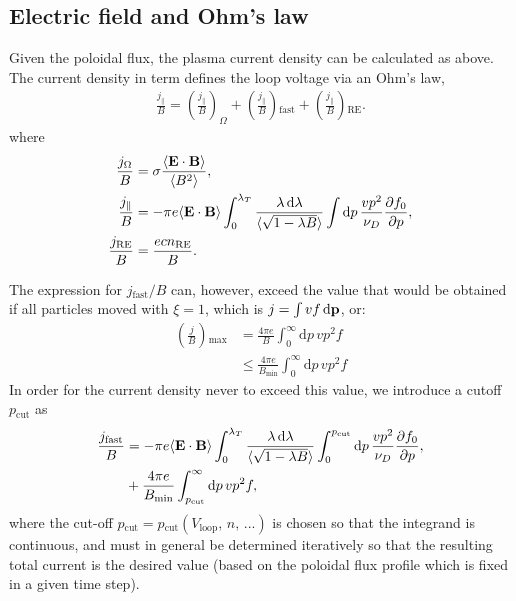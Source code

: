 \documentclass[11pt,a4paper]{article}
\newcommand{\rd}{\ensuremath{\mathrm{d}}}
\newcommand{\sub}[1]{\ensuremath{_{\text{#1}}}}
\renewcommand{\b}[1]{\ensuremath{ {\bf #1 } }}
\begin{document}
\subsection{Electric field and Ohm's law}
Given the poloidal flux, the plasma current density can be calculated as above. The current density in term defines the loop voltage via an Ohm's law,%
\begin{align}
\frac{j_\parallel}{B} = \left(\frac{j_\parallel}{B}\right)_\Omega + \left(\frac{j_\parallel}{B}\right)\sub{fast} + \left(\frac{j_\parallel}{B}\right)\sub{RE}.
\end{align}
where
\begin{align}
\frac{j_\Omega}{B} &= \sigma \frac{\langle \b{E}\cdot\b{B} \rangle}{\langle B^2\rangle}, \nonumber \\
\frac{j_\parallel}{B} &= -\pi  e\langle \b{E}\cdot\b{B}\rangle \int_0^{\lambda_T}\frac{\lambda\,\rd \lambda}{\langle\sqrt{1-\lambda B}\rangle}\int \rd p \, \frac{vp^2}{\nu_D}\frac{\partial f_0}{\partial p}, \nonumber\\
\frac{j\sub{RE}}{B} &= \frac{ecn\sub{RE}}{B}.
\end{align}

The expression for $j\sub{fast}/B$ can, however, exceed the value that would be obtained if all particles moved with $\xi=1$, which is $j=\int vf \,\rd\b{p}$, or:
\begin{align}
\left(\frac{j}{B}\right)\sub{max} &= \frac{4\pi e}{B} \int_0^\infty \rd p \,vp^2 f  \nonumber \\
&\leq  \frac{4\pi e}{B\sub{min}} \int_0^\infty \rd p \,vp^2 f 
\end{align}
In order for the current density never to exceed this value, we introduce a cutoff $p\sub{cut}$ as
\begin{align}
\frac{j\sub{fast}}{B} &=-\pi  e\langle \b{E}\cdot\b{B}\rangle \int_0^{\lambda_T}\frac{\lambda\,\rd \lambda}{\langle\sqrt{1-\lambda B}\rangle}\int_0^{p\sub{cut}} \rd p \, \frac{vp^2}{\nu_D}\frac{\partial f_0}{\partial p}, \nonumber \\
&+\frac{4\pi e }{B\sub{min}} \int_{p\sub{cut}}^\infty \rd p \,vp^2f,
\end{align}
where the cut-off $p\sub{cut} = p\sub{cut}(V\sub{loop},\,n,\,...)$ is chosen so that the integrand is continuous, and must in general be determined iteratively so that the resulting total current is the desired value (based on the poloidal flux profile which is fixed in a given time step).
\end{document}
